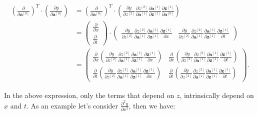 \documentclass{article}
\begin{document}
\begin{align}
\left(\frac{\partial}{\partial \textbf{a}^{[0]}}\right)^T \cdot \left(\frac{\partial y}{\partial \textbf{a}^{[0]}}\right)  
&= \left(\frac{\partial}{\partial \textbf{a}^{[0]}}\right)^T \cdot \left( \frac{\partial y}{\partial z^{[2]}} \frac{\partial z^{[2]}}{\partial \textbf{a}^{[1]}} \frac{\partial \textbf{a}^{[1]}}{\partial \textbf{z}^{[1]}}  \frac{\partial \textbf{z}^{[1]}}{\partial \textbf{a}^{[0]}}\right) \\
&= 
\begin{pmatrix}
\frac{\partial }{\partial x}  \\
\frac{\partial }{\partial t} 
\end{pmatrix}  \cdot 
\begin{pmatrix}
 \frac{\partial y}{\partial z^{[2]}} \frac{\partial z^{[2]}}{\partial \textbf{a}^{[1]}} \frac{\partial \textbf{a}^{[1]}}{\partial \textbf{z}^{[1]}}  \frac{\partial \textbf{z}^{[1]}}{\partial x}  &
 \frac{\partial y}{\partial z^{[2]}} \frac{\partial z^{[2]}}{\partial \textbf{a}^{[1]}} \frac{\partial \textbf{a}^{[1]}}{\partial \textbf{z}^{[1]}}  \frac{\partial \textbf{z}^{[1]}}{\partial t} 
\end{pmatrix} \\
&= 
\begin{pmatrix}
\frac{\partial }{\partial x}\left( \frac{\partial y}{\partial z^{[2]}} \frac{\partial z^{[2]}}{\partial \textbf{a}^{[1]}} \frac{\partial \textbf{a}^{[1]}}{\partial \textbf{z}^{[1]}}  \frac{\partial \textbf{z}^{[1]}}{\partial x}\right) &
\frac{\partial }{\partial x}\left(\frac{\partial y}{\partial z^{[2]}} \frac{\partial z^{[2]}}{\partial \textbf{a}^{[1]}} \frac{\partial \textbf{a}^{[1]}}{\partial \textbf{z}^{[1]}}  \frac{\partial \textbf{z}^{[1]}}{\partial t}\right)
\\
\frac{\partial }{\partial t} \left(\frac{\partial y}{\partial z^{[2]}} \frac{\partial z^{[2]}}{\partial \textbf{a}^{[1]}} \frac{\partial \textbf{a}^{[1]}}{\partial \textbf{z}^{[1]}}  \frac{\partial \textbf{z}^{[1]}}{\partial x}\right)
&
\frac{\partial }{\partial t} \left(\frac{\partial y}{\partial z^{[2]}} \frac{\partial z^{[2]}}{\partial \textbf{a}^{[1]}} \frac{\partial \textbf{a}^{[1]}}{\partial \textbf{z}^{[1]}}  \frac{\partial \textbf{z}^{[1]}}{\partial t}\right)
\end{pmatrix}.  
\end{align}


In the above expression, only the terms that depend on $z$, intrinsically depend on $x$ and $t$. As an example let's consider $\frac{\partial^2 y}{\partial x^2}$, then we have: 
\end{document}

